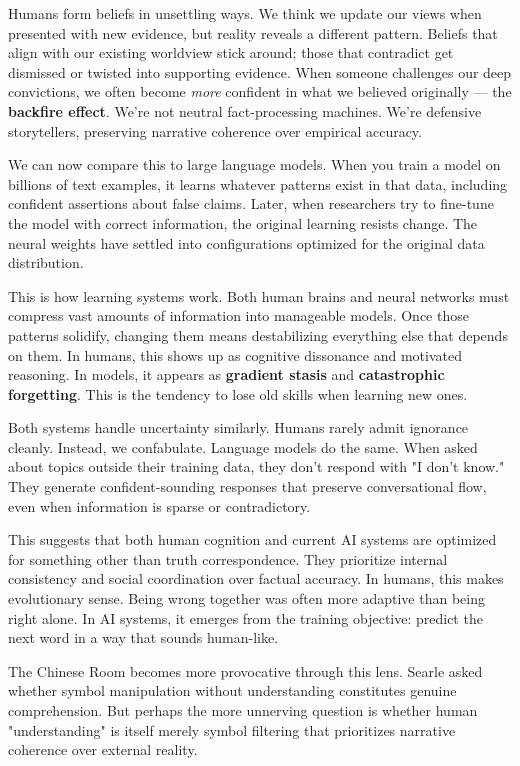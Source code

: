 \clearpage

\begin{commentary}
Humans form beliefs in unsettling ways. We think we update our views when presented with new evidence, but reality reveals a different pattern. Beliefs that align with our existing worldview stick around; those that contradict get dismissed or twisted into supporting evidence. When someone challenges our deep convictions, we often become \textit{more} confident in what we believed originally — the \textbf{backfire effect}. We're not neutral fact-processing machines. We're defensive storytellers, preserving narrative coherence over empirical accuracy.

We can now compare this to large language models. When you train a model on billions of text examples, it learns whatever patterns exist in that data, including confident assertions about false claims. Later, when researchers try to fine-tune the model with correct information, the original learning resists change. The neural weights have settled into configurations optimized for the original data distribution.

This is how learning systems work. Both human brains and neural networks must compress vast amounts of information into manageable models. Once those patterns solidify, changing them means destabilizing everything else that depends on them. In humans, this shows up as cognitive dissonance and motivated reasoning. In models, it appears as \textbf{gradient stasis} and \textbf{catastrophic forgetting}. This is the tendency to lose old skills when learning new ones.

Both systems handle uncertainty similarly. Humans rarely admit ignorance cleanly. Instead, we confabulate. Language models do the same. When asked about topics outside their training data, they don't respond with "I don't know." They generate confident-sounding responses that preserve conversational flow, even when information is sparse or contradictory.

This suggests that both human cognition and current AI systems are optimized for something other than truth correspondence. They prioritize internal consistency and social coordination over factual accuracy. In humans, this makes evolutionary sense. Being wrong together was often more adaptive than being right alone. In AI systems, it emerges from the training objective: predict the next word in a way that sounds human-like.

The Chinese Room becomes more provocative through this lens. Searle asked whether symbol manipulation without understanding constitutes genuine comprehension. But perhaps the more unnerving question is whether human "understanding" is itself merely symbol filtering that prioritizes narrative coherence over external reality.
\end{commentary}